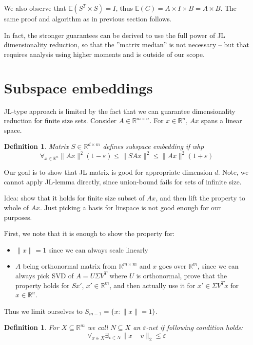 \documentclass[11pt]{article}
\newtheorem{definition}[theorem]{Definition}
\newcommand{\E}{{\mathbb E}}
\begin{document}
We also observe that $\E(S^T \times S) = I$, thus $\E(C) = A \times I \times B = A \times B$. The same proof and algorithm as in previous section follows.

In fact, the stronger guarantees can be derived to use the full power of JL dimensionality reduction, so that the ''matrix median'' is not necessary -- but that requires analysis using higher moments and is outside of our scope.

\section{Subspace embeddings}
JL-type approach is limited by the fact that we can guarantee dimensionality reduction for finite size sets. 
Consider $A \in \mathbb{R}^{m \times n}$. For $x \in \mathbb{R}^n$, $Ax$ spans a linear space.
\begin{definition}
Matrix $S \in \mathbb{R}^{d \times m}$ defines \emph{subspace embedding} if whp
$$ \forall_{x \in \mathbb{R}^n} \|Ax\|^2(1-\varepsilon) \le \|SAx\|^2 \le  \|Ax\|^2(1+\varepsilon) $$
\end{definition}

Our goal is to show that JL-matrix is good for appropriate dimension $d$. Note, we cannot apply JL-lemma directly, since union-bound fails for sets of infinite size.

Idea: show that it holds for finite size subset of $Ax$, and then lift the property to whole of $Ax$. Just picking a basis for linspace is not good enough for our purposes.

First, we note that it is enough to show the property for:
\begin{itemize}
\item $\|x\|=1$ since we can always scale linearly
\item $A$ being orthonormal matrix from $\mathbb{R}^{m \times m}$ and $x$ goes over $\mathbb{R}^m$, since we can always pick SVD of $A = U \Sigma V^T$ where $U$ is orthonormal, prove that the property holds for $Sx'$, $x' \in \mathbb{R}^m$, and then actually use it for $x' \in \Sigma V^T x$ for $x \in \mathbb{R}^n$.
\end{itemize}

Thus we limit ourselves to $S_{m-1} = \{x : \|x\| = 1\}$.

\begin{definition}
For $X \subseteq \mathbb{R}^m$ we call $N \subseteq X$ an $\varepsilon$-net if following condition holds:
$$\forall_{x \in X} \exists_{v \in N} \|x-v\|_2 \le \varepsilon$$
\end{definition}
\end{document}
